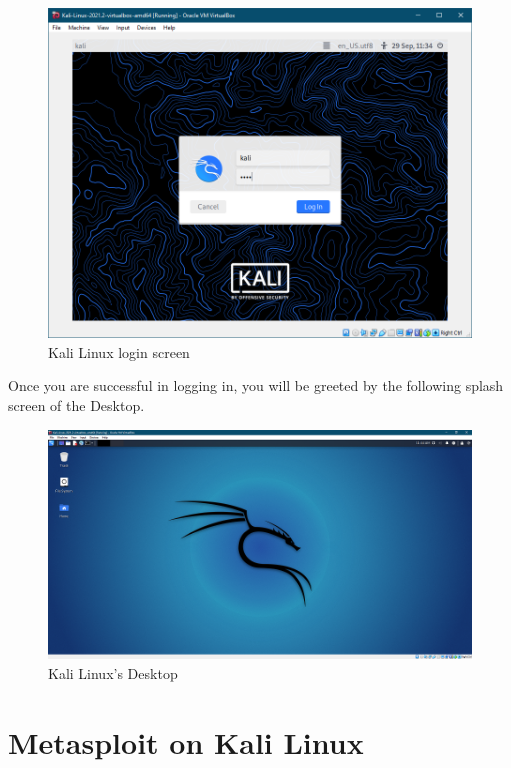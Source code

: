 \documentclass[a4paper, 12pt, titlepage]{report}
\begin{document}
\begin{figure}[H]
    \centering
    \includegraphics[scale=0.5]{pics/kalimain.PNG}
    \caption{Kali Linux login screen}
\end{figure}
Once you are successful in logging in, you will be greeted by the following splash screen of the Desktop.
\begin{figure}[H]
    \centering
    \includegraphics[scale=0.5]{pics/kalihome.PNG}
    \caption{Kali Linux's Desktop}
\end{figure}
\section{Metasploit on Kali Linux}
\end{document}
